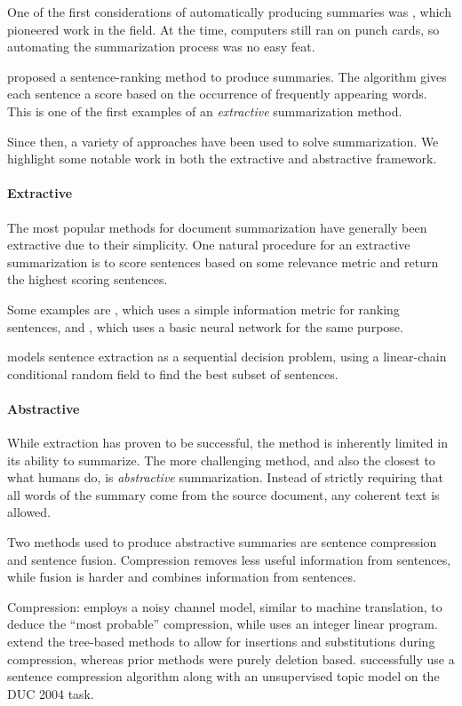 \documentclass[11pt]{report}
\begin{document}
One of the first considerations of automatically producing summaries was \citet{luhn1958automatic}, which pioneered work in the field. At the time, computers still ran on punch cards, so automating the summarization process was no easy feat.

\citet{luhn1958automatic} proposed a sentence-ranking method to produce summaries. The algorithm gives each sentence a score based on the occurrence of frequently appearing words. This is one of the first examples of an \emph{extractive} summarization method.

Since then, a variety of approaches have been used to solve summarization. We highlight some notable work in both the extractive and abstractive framework.

\paragraph{Extractive} The most popular methods for document summarization have generally been extractive due to their simplicity. One natural procedure for an extractive summarization is to score sentences based on some relevance metric and return the highest scoring sentences.

Some examples are \cite{carbonell1998MMR}, which uses a simple information metric for ranking sentences, and \cite{svore2007}, which uses a basic neural network for the same purpose.

\citet{Shen2004} models sentence extraction as a sequential decision problem, using a linear-chain conditional random field to find the best subset of sentences.



\paragraph{Abstractive} While extraction has proven to be successful, the method is inherently limited in its ability to summarize. The more challenging method, and also the closest to what humans do, is \emph{abstractive} summarization. Instead of strictly requiring that all words of the summary come from the source document, any coherent text is allowed.

Two methods used to produce abstractive summaries are sentence compression and sentence fusion. Compression removes less useful information from sentences, while fusion is harder and combines information from sentences. %

Compression: \citet{knight2002summarization} employs a noisy channel model, similar to machine translation, to deduce the ``most probable'' compression, while \citet{clarke2008global} uses an integer linear program. \citet{cohn2008sentence} extend the tree-based methods to allow for insertions and substitutions during compression, whereas prior methods were purely deletion based. \cite{zajic2004topiary} successfully use a sentence compression algorithm along with an unsupervised topic model on the DUC 2004 task.
\end{document}
